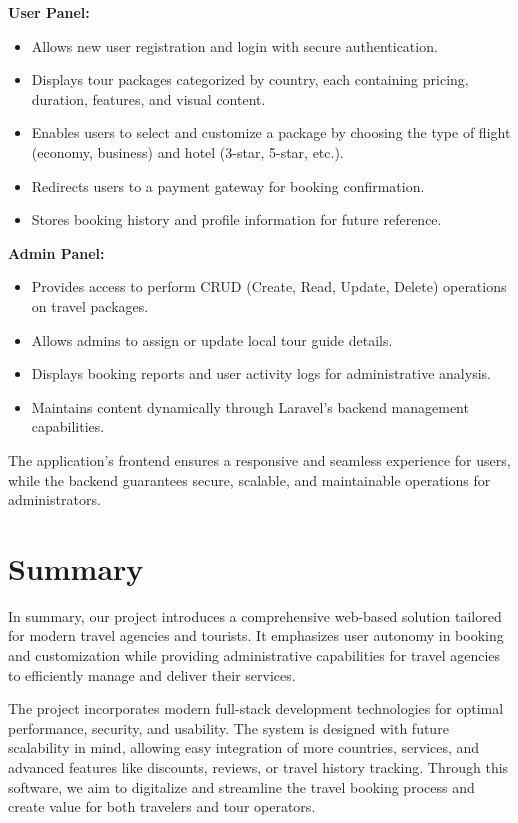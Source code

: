 \textbf{User Panel:}
\begin{itemize}
    \item Allows new user registration and login with secure authentication.
    \item Displays tour packages categorized by country, each containing pricing, duration, features, and visual content.
    \item Enables users to select and customize a package by choosing the type of flight (economy, business) and hotel (3-star, 5-star, etc.).
    \item Redirects users to a payment gateway for booking confirmation.
    \item Stores booking history and profile information for future reference.
\end{itemize}

\textbf{Admin Panel:}
\begin{itemize}
    \item Provides access to perform CRUD (Create, Read, Update, Delete) operations on travel packages.
    \item Allows admins to assign or update local tour guide details.
    \item Displays booking reports and user activity logs for administrative analysis.
    \item Maintains content dynamically through Laravel’s backend management capabilities.
\end{itemize}

The application’s frontend ensures a responsive and seamless experience for users, while the backend guarantees secure, scalable, and maintainable operations for administrators.

\section{Summary}
In summary, our project introduces a comprehensive web-based solution tailored for modern travel agencies and tourists. It emphasizes user autonomy in booking and customization while providing administrative capabilities for travel agencies to efficiently manage and deliver their services.

The project incorporates modern full-stack development technologies for optimal performance, security, and usability. The system is designed with future scalability in mind, allowing easy integration of more countries, services, and advanced features like discounts, reviews, or travel history tracking. Through this software, we aim to digitalize and streamline the travel booking process and create value for both travelers and tour operators.

